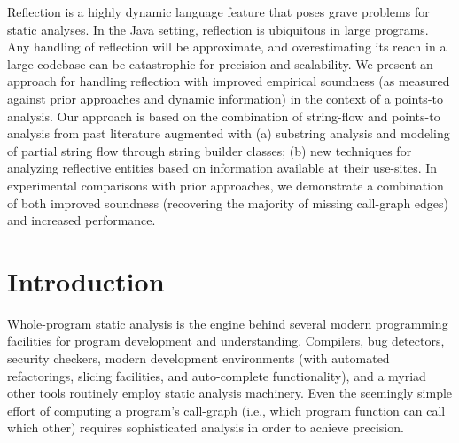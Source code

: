 Reflection is a highly dynamic language feature that poses grave
problems for static analyses.  In the Java setting, reflection is
ubiquitous in large programs.
Any handling of reflection will be approximate, and overestimating its
reach in a large codebase can be catastrophic for precision and
scalability. We present an approach for handling reflection with
improved empirical soundness (as measured against prior approaches and
dynamic information) in the context of a points-to analysis. Our
approach is based on the combination of string-flow and points-to
analysis from past literature augmented with (a) substring analysis
and modeling of partial string flow through string builder classes;
(b) new techniques for analyzing reflective entities based on
information available at their use-sites.
In experimental comparisons with prior approaches, we demonstrate a
combination of both improved soundness (recovering the majority of
missing call-graph edges) and increased performance.


\section{Introduction}

Whole-program static analysis is the engine behind several modern
programming facilities for program development and
understanding. Compilers, bug detectors, security checkers, modern
development environments (with automated refactorings, slicing
facilities, and auto-complete functionality), and a myriad other tools
routinely employ static analysis machinery. Even the seemingly simple
effort of computing a program's call-graph (i.e., which program
function can call which other) requires sophisticated analysis in
order to achieve precision.

